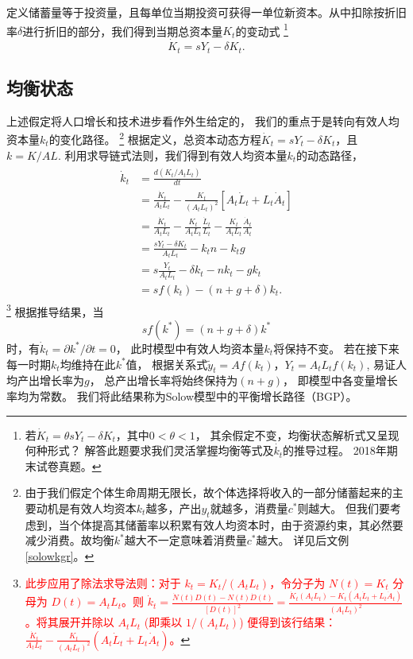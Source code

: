 \documentclass[cn,normal,11pt,black]{elegantnote}
\begin{document}
\begin{definition}[资本动态方程]
    定义储蓄量等于投资量，且每单位当期投资可获得一单位新资本。从中扣除按折旧率$\delta$进行折旧的部分，我们得到当期总资本量$K_t$的变动式
    \footnote{若$\dot{K}_t = \theta s Y_t-\delta K_t$，其中$0<\theta <1$，
        其余假定不变，均衡状态解析式又呈现何种形式？
        解答此题要求我们灵活掌握均衡等式及$\dot{k_t}$的推导过程。
        2018年期末试卷真题。}
\begin{equation}
    \dot{K}_t = s Y_t-\delta K_t .
\end{equation}
\end{definition}

\subsection{均衡状态}

上述假定将人口增长和技术进步看作外生给定的，
我们的重点于是转向有效人均资本量$k_t$的变化路径。
            \footnote{
    由于我们假定个体生命周期无限长，故个体选择将收入的一部分储蓄起来的主要动机是有效人均资本$k_t$越多，产出$y_t$就越多，消费量$c^*$则越大。
    但我们要考虑到，当个体提高其储蓄率以积累有效人均资本时，由于资源约束，其必然要减少消费。故均衡$k^*$越大不一定意味着消费量$c^*$越大。
        详见后文例\ref{solowkgr}。}
根据定义，总资本动态方程$\dot{K}_t = s Y_t-\delta K_t$，且$k=K/AL$.
利用求导链式法则，我们得到有效人均资本量$k_t$的动态路径，
\begin{align}
  \begin{aligned}
        \dot{k}_t & = \frac{d \left(K_t / A_t L_t \right)}{d t} \\
                  & = \frac{\dot{K}_t}{A_t L_t}-\frac{K_t}{(A_t L_t)^{2}}[A_t \dot{L}_t+L_t \dot{A}_t] \\
                  & = \frac{\dot{K}_t}{A_t L_t}-\frac{K_t}{A_t L_t} \frac{\dot{L}_t}{L_t}-
                            \frac{K_t}{A_t L_t} \frac{\dot{A}_t}{A_t} \\
                  & = \frac{s Y_t-\delta K_t}{A_t L_t}-k_t n-k_t g \\
                  & = s \frac{Y_t}{A_t L_t}-\delta k_t-n k_t-g k_t \\
                  & = sf(k_t) - (n+g+\delta)k_t .
  \end{aligned}
\end{align}
\footnote{\textcolor{red}{此步应用了除法求导法则：对于 $k_t = K_t / (A_t L_t)$，令分子为 $N(t)=K_t$ 分母为 $D(t)=A_t L_t$。则 $\dot{k}_t = \frac{\dot{N}(t)D(t) - N(t)\dot{D}(t)}{[D(t)]^2} = \frac{\dot{K}_t (A_t L_t) - K_t (A_t \dot{L}_t + L_t \dot{A}_t)}{(A_t L_t)^2}$。将其展开并除以 $A_t L_t$ (即乘以 $1/(A_tL_t)$) 便得到该行结果：$\frac{\dot{K}_t}{A_t L_t} - \frac{K_t}{(A_t L_t)^2}(A_t \dot{L}_t + L_t \dot{A}_t)$。}}
根据推导结果，当
    \begin{equation}\label{solowequi}
       sf(k^*) = (n+g+\delta)k^*  
    \end{equation}
时，有$\dot{k}_t = \partial k^* / \partial t = 0$，
此时模型中有效人均资本量$k_t$将保持不变。
若在接下来每一时期$k_t$均维持在此$k^*$值，
根据关系式$\tilde{y}_t = Af(k_t)$，$Y_t=A_tL_tf(k_t)$,
易证人均产出增长率为$g$，
总产出增长率将始终保持为$(n+g)$，
即模型中各变量增长率均为常数。
我们将此结果称为Solow模型中的平衡增长路径（BGP）。
\end{document}
